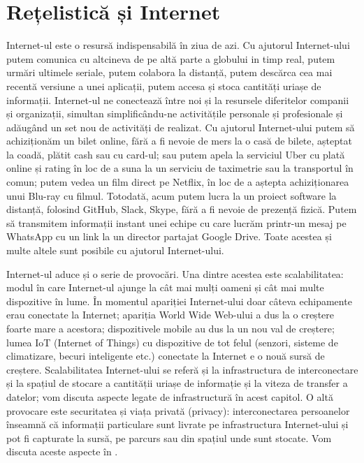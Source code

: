 \chapter{Rețelistică și Internet}
\label{chapter:net}

Internet-ul este o resursă indispensabilă în ziua de azi. Cu ajutorul Internet-ului putem comunica cu altcineva de pe altă parte a globului in timp real, putem urmări ultimele seriale, putem colabora la distanță, putem descărca cea mai recentă versiune a unei aplicații, putem accesa și stoca cantități uriașe de informații. Internet-ul ne conectează între noi și la resursele diferitelor companii și organizații, simultan simplificându-ne activitățile personale și profesionale și adăugând un set nou de activități de realizat. Cu ajutorul Internet-ului putem să achiziționăm un bilet online, fără a fi nevoie de mers la o casă de bilete, așteptat la coadă, plătit cash sau cu card-ul; sau putem apela la serviciul Uber cu plată online și rating în loc de a suna la un serviciu de taximetrie sau la transportul în comun; putem vedea un film direct pe Netflix, în loc de a aștepta achiziționarea unui Blu-ray cu filmul. Totodată, acum putem lucra la un proiect software la distanță, folosind GitHub, Slack, Skype, fără a fi nevoie de prezență fizică. Putem să transmitem informații instant unei echipe cu care lucrăm printr-un mesaj pe WhatsApp cu un link la un director partajat Google Drive. Toate acestea și multe altele sunt posibile cu ajutorul Internet-ului.

Internet-ul aduce și o serie de provocări. Una dintre acestea este scalabilitatea: modul în care Internet-ul ajunge la cât mai mulți oameni și cât mai multe dispozitive în lume. În momentul apariției Internet-ului doar câteva echipamente erau conectate la Internet; apariția World Wide Web-ului a dus la o creștere foarte mare a acestora; dispozitivele mobile au dus la un nou val de creștere; lumea IoT (Internet of Things) cu dispozitive de tot felul (senzori, sisteme de climatizare, becuri inteligente etc.) conectate la Internet e o nouă sursă de creștere. Scalabilitatea Internet-ului se referă și la infrastructura de interconectare și la spațiul de stocare a cantității uriașe de informație și la viteza de transfer a datelor; vom discuta aspecte legate de infrastructură în acest capitol. O altă provocare este securitatea și viața privată (privacy): interconectarea persoanelor înseamnă că informații particulare sunt livrate pe infrastructura Internet-ului și pot fi capturate la sursă, pe parcurs sau din spațiul unde sunt stocate. Vom discuta aceste aspecte în .

